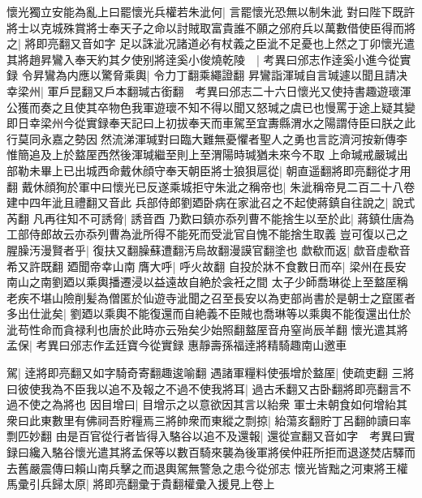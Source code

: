 懷光獨立安能為亂上曰罷懷光兵權若朱泚何|{
	言罷懷光恐無以制朱泚}
對曰陛下既許將士以克城殊賞將士奉天子之命以討賊取富貴誰不願之邠府兵以萬數借使臣得而將之|{
	將即亮翻又音如字}
足以誅泚况諸道必有杖義之臣泚不足憂也上然之丁卯懷光遣其將趙昇鸞入奉天約其夕使别將逹奚小俊燒乾陵　|{
	考異曰邠志作逹奚小進今從實録}
令昇鸞為内應以驚脅乘輿|{
	令力丁翻乘繩證翻}
昇鸞詣渾瑊自言瑊遽以聞且請决幸梁州|{
	軍戶昆翻又戶本翻瑊古銜翻　考異曰邠志二十六日懷光又使持書趣遊瓌渾公獲而奏之且使其卒物色我軍遊瓌不知不得以聞又怒瑊之虞已也慢罵于途上疑其變即日幸梁州今從實録奉天記曰上初拔奉天而車駕至宜夀縣渭水之陽謂侍臣曰朕之此行莫同永嘉之勢因然流涕渾瑊對曰臨大難無憂懼者聖人之勇也言訖濟河按新傳李惟簡追及上於盩厔西然後渾瑊繼至則上至渭陽時瑊猶未來今不取}
上命瑊戒嚴瑊出部勒未畢上已出城西命戴休顔守奉天朝臣將士狼狽扈從|{
	朝直遥翻將即亮翻從才用翻}
戴休顔狥於軍中曰懷光已反遂乘城拒守朱泚之稱帝也|{
	朱泚稱帝見二百二十八卷建中四年泚且禮翻又音此}
兵部侍郎劉廼卧病在家泚召之不起使蔣鎮自往說之|{
	說式芮翻}
凡再往知不可誘脅|{
	誘音酉}
乃歎曰鎮亦忝列曹不能捨生以至於此|{
	蔣鎮仕唐為工部侍郎故云亦忝列曹為泚所得不能死而受泚官自愧不能捨生取義}
豈可復以己之腥臊汚漫賢者乎|{
	復扶又翻臊蘇遭翻汚烏故翻漫謨官翻塗也}
歔欷而返|{
	歔音虛欷音希又許既翻}
廼聞帝幸山南膺大呼|{
	呼火故翻}
自投於牀不食數日而卒|{
	梁州在長安南山之南劉廼以乘輿播遷浸以益遠故自絶於衾衽之間}
太子少師喬琳從上至盩厔稱老疾不堪山險削髪為僧匿於仙遊寺泚聞之召至長安以為吏部尚書於是朝士之竄匿者多出仕泚矣|{
	劉廼以乘輿不能復還而自絶義不臣賊也喬琳等以乘輿不能復還出仕於泚苟性命而貪禄利也唐於此時亦云殆矣少始照翻盩厔音舟窒尚辰羊翻}
懷光遣其將孟保|{
	考異曰邠志作孟廷寶今從實録}
惠靜壽孫福逹將精騎趣南山邀車

駕|{
	逹將即亮翻又如字騎奇寄翻趣逡喻翻}
遇諸軍糧料使張增於盩厔|{
	使疏吏翻}
三將曰彼使我為不臣我以追不及報之不過不使我將耳|{
	過古禾翻又古卧翻將即亮翻言不過不使之為將也}
因目增曰|{
	目增示之以意欲因其言以紿衆}
軍士未朝食如何增紿其衆曰此東數里有佛祠吾貯糧焉三將帥衆而東縱之剽掠|{
	紿蕩亥翻貯丁呂翻帥讀曰率剽匹妙翻}
由是百官從行者皆得入駱谷以追不及還報|{
	還從宣翻又音如字　考異曰實録曰纔入駱谷懷光遣其將孟保等以數百騎來襲為後軍將侯仲莊所拒而退遂焚店驛而去舊嚴震傳曰賴山南兵擊之而退輿駕無警急之患今從邠志}
懷光皆黜之河東將王權馬彚引兵歸太原|{
	將即亮翻彚于貴翻權彚入援見上卷上}


